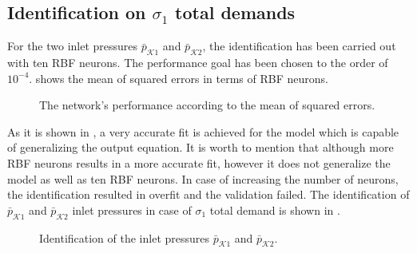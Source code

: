  \vspace{-3mm}

 \subsection{Identification on $\sigma_1$ total demands}
 \label{identification_sigma1}

For the two inlet pressures $\bar{p}_{\mathcal{K}1}$ and $\bar{p}_{\mathcal{K}2}$, the identification has been carried out with ten RBF neurons. The performance goal has been chosen to the order of $10^{-4}$.  shows the mean of squared errors in terms of RBF neurons. 

 \begin{figure}[H]
 \centering
  
 \vspace{-2.5mm}
 \caption{The network’s performance according to the mean of squared errors.}
 \label{fig:MSE_output}
 \end{figure}

 \vspace{-4mm}

As it is shown in , a very accurate fit is achieved for the model which is capable of generalizing the output equation. It is worth to mention that although more RBF neurons results in a more accurate fit, however it does not generalize the model as well as ten RBF neurons. In case of increasing the number of neurons, the identification resulted in overfit and the validation failed. The identification of $\bar{p}_{\mathcal{K}1}$ and $\bar{p}_{\mathcal{K}2}$ inlet pressures in case of $\sigma_1$ total demand is shown in .

\vspace{-2mm}

 \begin{figure}[H]
 \centering
  
 \vspace{-2.5mm}
 \caption{Identification of the inlet pressures $\bar{p}_{\mathcal{K}1}$ and $\bar{p}_{\mathcal{K}2}$.}
 \label{fig:pk1_sigma1}
 \end{figure}

 \vspace{-4mm}

